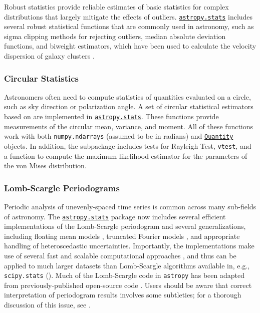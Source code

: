 \documentclass[modern]{aastex62}
\newcommand{\package}[1]{\texttt{#1}\xspace}
\newcommand{\astropypkg}{\package{astropy}}
\newcommand{\astropysubpkg}[1]{\href{http://docs.astropy.org/en/stable/#1/index.html}{\texttt{astropy.#1}}\xspace}
\newcommand{\astropyQuantity}{\href{http://docs.astropy.org/en/stable/api/astropy.units.Quantity.html}{\texttt{Quantity}}\xspace}
\begin{document}
Robust statistics provide reliable estimates of basic statistics for complex
distributions that largely mitigate the effects of outliers.
\astropysubpkg{stats} includes several robust statistical functions that are
commonly used in astronomy, such as sigma clipping methods for rejecting
outliers, median absolute deviation functions, and biweight estimators,
which have been used to calculate the velocity dispersion of galaxy clusters
\citep{Beers1990}.

\subsubsection{Circular Statistics}

Astronomers often need to compute statistics of quantities evaluated on a
circle, such as sky direction or polarization angle.
A set of circular statistical estimators based on \citet{JammalamadakaSengupta}
are implemented in \astropysubpkg{stats}.  These functions provide
measurements of the circular mean, variance, and moment.   All of these
functions work with both \texttt{numpy.ndarrays} (assumed to be in radians) and
\astropyQuantity objects.  In addition, the subpackage includes
tests for Rayleigh Test, \texttt{vtest}, and a function to compute the maximum
likelihood estimator for the parameters of the von Mises distribution.

\subsubsection{Lomb-Scargle Periodograms}

Periodic analysis of unevenly-spaced time series is common across many
sub-fields of astronomy. The \astropysubpkg{stats} package now includes
several efficient implementations of the Lomb-Scargle periodogram
\citep{Lomb76, Scargle82} and several generalizations, including floating mean
models \citep{Zechmeister09}, truncated Fourier models \citep{Bretthorst2003},
and appropriate handling of heteroscedastic uncertainties.
Importantly, the implementations make use of several fast and scalable
computational approaches \citep[e.g.,][]{Press89, Palmer09}, and thus can be
applied to much larger datasets than Lomb-Scargle algorithms available in,
e.g., \package{scipy.stats} (\citealt{scipy}). Much of the Lomb-Scargle code
in \astropypkg has been adapted from previously-published open-source code
\citep{astroML, VanderPlas2015}. Users should be aware that correct
interpretation of periodogram results involves some subtleties; for a thorough
discussion of this issue, see \citet[][in press]{VanderPlas2018}.
\end{document}

